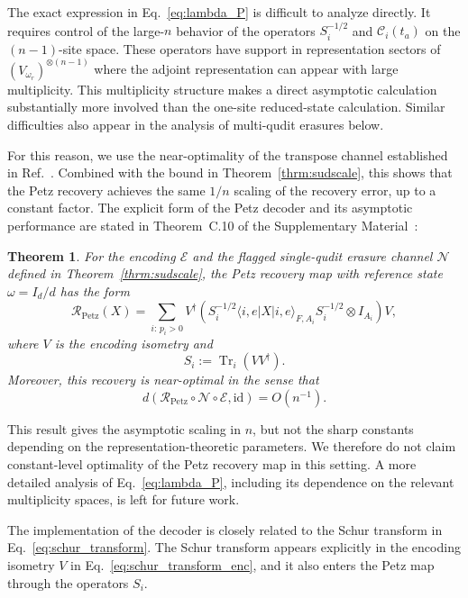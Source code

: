 \documentclass[10pt,twocolumn,superscriptaddress,aps,amsmath,amssymb,citeautoscript,floatfix,prx,longbibliography]{revtex4-2}
\newtheorem{theorem}{Theorem}
\theoremstyle{plain}
\theoremstyle{plain}
\theoremstyle{plain}
\theoremstyle{plain}
\theoremstyle{plain}
\theoremstyle{plain}
\begin{document}
The exact expression in Eq.~\eqref{eq:lambda_P} is difficult to analyze directly. It requires control of the large-$n$ behavior of the operators $S_i^{-1/2}$ and $\mathcal C_i(t_a)$ on the $(n-1)$-site space. These operators have support in representation sectors of $(V_{\omega_r})^{\otimes(n-1)}$ where the adjoint representation can appear with large multiplicity. This multiplicity structure makes a direct asymptotic calculation substantially more involved than the one-site reduced-state calculation. Similar difficulties also appear in the analysis of multi-qudit erasures below.

For this reason, we use the near-optimality of the transpose channel established in Ref.~\cite{Ng2010}. Combined with the bound in Theorem~\ref{thrm:sudscale}, this shows that the Petz recovery achieves the same $1/n$ scaling of the recovery error, up to a constant factor. The explicit form of the Petz decoder and its asymptotic performance are stated in Theorem~C.10 of the Supplementary Material~\cite{SuppMat}:

\begin{theorem}
For the encoding $\mathcal E$ and the flagged single-qudit erasure channel $\mathcal N$ defined in Theorem~\ref{thrm:sudscale}, the Petz recovery map with reference state $\omega=I_d/d$ has the form
$$
    \mathcal R_{\mathrm{Petz}}(X)
    =
    \sum_{i:\,p_i>0}
    V^\dagger
    \left(
        S_i^{-1/2}
        \langle i,e|X|i,e\rangle_{F,A_i}
        S_i^{-1/2}
        \otimes I_{A_i}
    \right)
    V,
$$
where $V$ is the encoding isometry and
$$
    S_i
    :=
    \operatorname{Tr}_i\left(VV^\dagger\right).
$$
Moreover, this recovery is near-optimal in the sense that
$$
    d\left(
        \mathcal R_{\mathrm{Petz}}
        \circ
        \mathcal N
        \circ
        \mathcal E,
        \mathrm{id}
    \right)
    =
    O(n^{-1}) .
$$
\end{theorem}

This result gives the asymptotic scaling in $n$, but not the sharp constants depending on the representation-theoretic parameters. We therefore do not claim constant-level optimality of the Petz recovery map in this setting. A more detailed analysis of Eq.~\eqref{eq:lambda_P}, including its dependence on the relevant multiplicity spaces, is left for future work.

The implementation of the decoder is closely related to the Schur transform in Eq.~\eqref{eq:schur_transform}. The Schur transform appears explicitly in the encoding isometry $V$ in Eq.~\eqref{eq:schur_transform_enc}, and it also enters the Petz map through the operators $S_i$.
\end{document}

